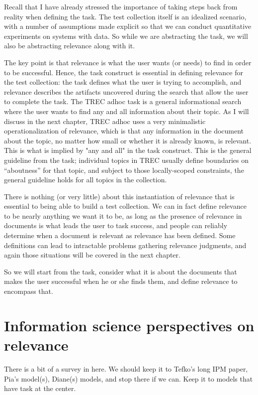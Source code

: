 \documentclass[nobib]{tufte-book}
\begin{document}
Recall that I have already stressed the importance of taking steps back from reality when defining the task.  The test collection itself is an idealized scenario, with a number of assumptions made explicit so that we can conduct quantitative experiments on systems with data.  So while we are abstracting the task, we will also be abstracting relevance along with it.

The key point is that relevance is what the user wants (or needs) to find in order to be successful.  Hence, the task construct is essential in defining relevance for the test collection: the task defines what the user is trying to accomplish, and relevance describes the artifacts uncovered during the search that allow the user to complete the task.  The TREC adhoc task is a general informational search where the user wants to find any and all information about their topic.  As I will discuss in the next chapter, TREC adhoc uses a very minimalistic operationalization of relevance, which is that any information in the document about the topic, no matter how small or whether it is already known, is relevant.  This is what is implied by "any and all" in the task construct.  This is the general guideline from the task; individual topics in TREC usually define boundaries on ``aboutness'' for that topic, and subject to those locally-scoped constraints, the general guideline holds for all topics in the collection.

There is nothing (or very little) about this instantiation of relevance that is essential to being able to build a test collection.  We can in fact define relevance to be nearly anything we want it to be, as long as the presence of relevance in documents is what leads the user to task success, and people can reliably determine when a document is relevant as relevance has been defined.  Some definitions can lead to intractable problems gathering relevance judgments, and again those situations will be covered in the next chapter.

So we will start from the task, consider what it is about the documents that makes the user successful when he or she finds them, and define relevance to encompass that.

\section{Information science perspectives on relevance}

There is a bit of a survey in here.  We should keep it to Tefko's long IPM paper, Pia's model(s), Diane(s) models, and stop there if we can.  Keep it to models that have task at the center.
\end{document}
